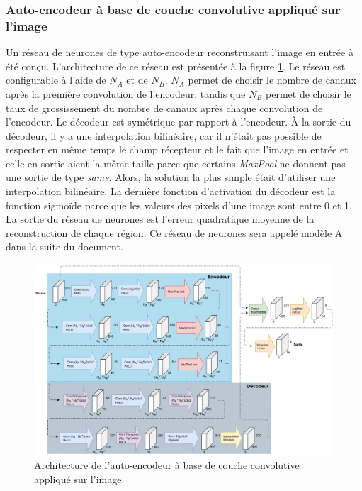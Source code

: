 \subsubsection{Auto-encodeur à base de couche convolutive appliqué sur l'image}
    Un réseau de neurones de type auto-encodeur reconstruisant l'image en entrée à été conçu. L'architecture de ce réseau est présentée à la figure \ref{fig:architecture_cnn_autoencoder}. Le réseau est configurable à l'aide de \(N_A\) et de \(N_B\). \(N_A\) permet de choisir le nombre de canaux après la première convolution de l'encodeur, tandis que \(N_B\) permet de choisir le taux de grossissement du nombre de canaux après chaque convolution de l'encodeur. Le décodeur est symétrique par rapport à l'encodeur. À la sortie du décodeur, il y a une interpolation bilinéaire, car il n'était pas possible de respecter en même temps le champ récepteur et le fait que l'image en entrée et celle en sortie aient la même taille parce que certains \textit{MaxPool} ne donnent pas une sortie de type \textit{same}. Alors, la solution la plus simple était d'utiliser une interpolation bilinéaire. La dernière fonction d'activation du décodeur est la fonction sigmoïde parce que les valeurs des pixels d'une image sont entre 0 et 1. La sortie du réseau de neurones est l'erreur quadratique moyenne de la reconstruction de chaque région. Ce réseau de neurones sera appelé modèle A dans la suite du document.
    \begin{figure}[H]
        \centering
        \includegraphics[width=17cm]{images/Architecture_CnnAutoencoder.png}
        \caption{Architecture de l'auto-encodeur à base de couche convolutive appliqué sur l'image}
        \label{fig:architecture_cnn_autoencoder}
    \end{figure}

